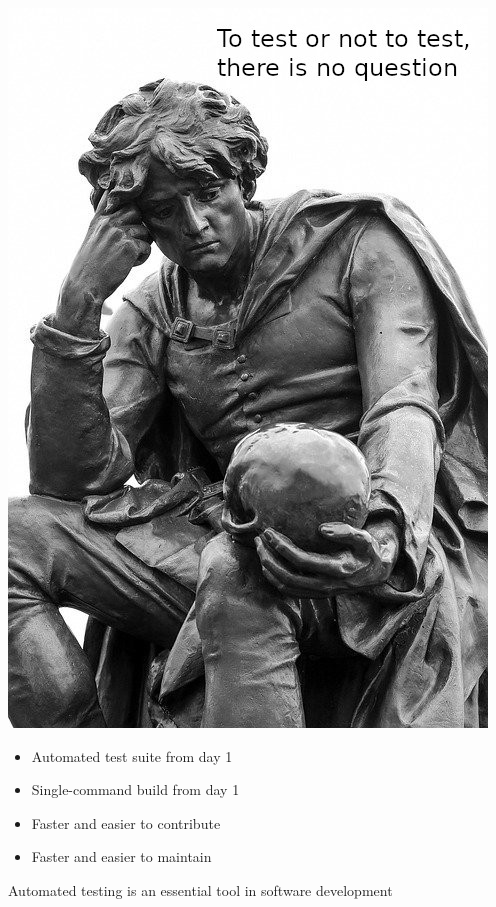 \documentclass[pdf]{beamer}
\begin{document}
\begin{frame}
    \begin{center}
        \includegraphics[height=0.8\textheight, keepaspectratio]{img/hamlet-text}
    \end{center}
\end{frame}

\begin{frame}
    \begin{itemize}
        \item Automated test suite from day 1
        \item Single-command build from day 1
        \item Faster and easier to contribute
        \item Faster and easier to maintain
    \end{itemize}

    Automated testing is an essential tool in software development
\end{frame}
\end{document}
